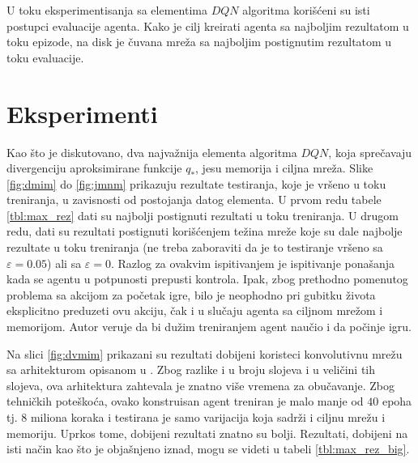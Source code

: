 \par 
U toku eksperimentisanja sa elementima $DQN$ algoritma korišćeni su isti postupci evaluacije agenta. Kako je cilj kreirati agenta sa najboljim rezultatom u toku epizode, na disk je čuvana mreža sa najboljim postignutim rezultatom u toku evaluacije.

\section{Eksperimenti}
\label{sec:eksperimenti}
Kao što je diskutovano, dva najvažnija elementa algoritma $DQN$, koja sprečavaju divergenciju aproksimirane funkcije $q_*$, jesu memorija i ciljna mreža. Slike \ref{fig:dmim} do \ref{fig:jmnm} prikazuju rezultate testiranja, koje je vršeno u toku treniranja, u zavisnosti od postojanja datog elementa. U prvom redu tabele \ref{tbl:max_rez} dati su najbolji postignuti rezultati u toku treniranja. U drugom redu, dati su rezultati postignuti korišćenjem težina mreže koje su dale najbolje rezultate u toku treniranja (ne treba zaboraviti da je to testiranje vršeno sa $\varepsilon = 0.05$) ali sa $\varepsilon = 0$. Razlog za ovakvim ispitivanjem je ispitivanje ponašanja kada se agentu u potpunosti prepusti kontrola. Ipak, zbog prethodno pomenutog problema sa akcijom za početak igre, bilo je neophodno pri gubitku života eksplicitno preduzeti ovu akciju, čak i u slučaju agenta sa ciljnom mrežom i memorijom. Autor veruje da bi dužim treniranjem agent naučio i da počinje igru.
\par 
Na slici \ref{fig:dvmim} prikazani su rezultati dobijeni koristeci konvolutivnu mrežu sa arhitekturom opisanom u \cite{dqn_dm}. Zbog razlike i u broju slojeva i u veličini tih slojeva, ova arhitektura zahtevala je znatno više vremena za obučavanje. Zbog tehničkih poteškoća, ovako konstruisan agent treniran je malo manje od $40$ epoha tj. $8$ miliona koraka i testirana je samo varijacija koja sadrži i ciljnu mrežu i memoriju. Uprkos tome, dobijeni rezultati znatno su bolji. Rezultati, dobijeni na isti način kao što je objašnjeno iznad, mogu se videti u tabeli \ref{tbl:max_rez_big}.


